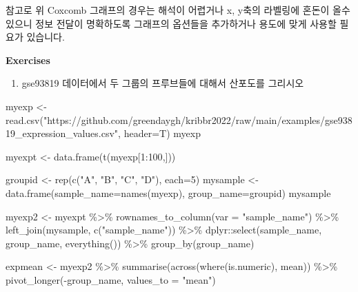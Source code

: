 \documentclass[
]{book}
\newenvironment{Shaded}{\begin{snugshade}}{\end{snugshade}}
\newcommand{\AttributeTok}[1]{\textcolor[rgb]{0.77,0.63,0.00}{#1}}
\newcommand{\DecValTok}[1]{\textcolor[rgb]{0.00,0.00,0.81}{#1}}
\newcommand{\FunctionTok}[1]{\textcolor[rgb]{0.00,0.00,0.00}{#1}}
\newcommand{\NormalTok}[1]{#1}
\newcommand{\OtherTok}[1]{\textcolor[rgb]{0.56,0.35,0.01}{#1}}
\newcommand{\SpecialCharTok}[1]{\textcolor[rgb]{0.00,0.00,0.00}{#1}}
\newcommand{\StringTok}[1]{\textcolor[rgb]{0.31,0.60,0.02}{#1}}
\providecommand{\tightlist}{%
  \setlength{\itemsep}{0pt}\setlength{\parskip}{0pt}}
\begin{document}
참고로 위 Coxcomb 그래프의 경우는 해석이 어렵거나 x, y축의 라벨링에 혼돈이 올수 있으니 정보 전달이 명확하도록 그래프의 옵션들을 추가하거나 용도에 맞게 사용할 필요가 있습니다.

\textbf{Exercises}

\begin{enumerate}
\def\labelenumi{\arabic{enumi}.}
\tightlist
\item
  gse93819 데이터에서 두 그룹의 프루브들에 대해서 산포도를 그리시오
\end{enumerate}

\begin{Shaded}
\begin{Highlighting}[]
\NormalTok{myexp }\OtherTok{\textless{}{-}} \FunctionTok{read.csv}\NormalTok{(}\StringTok{"https://github.com/greendaygh/kribbr2022/raw/main/examples/gse93819\_expression\_values.csv"}\NormalTok{, }\AttributeTok{header=}\NormalTok{T)}
\NormalTok{myexp}

\NormalTok{myexpt }\OtherTok{\textless{}{-}} \FunctionTok{data.frame}\NormalTok{(}\FunctionTok{t}\NormalTok{(myexp[}\DecValTok{1}\SpecialCharTok{:}\DecValTok{100}\NormalTok{,]))}

\NormalTok{groupid }\OtherTok{\textless{}{-}} \FunctionTok{rep}\NormalTok{(}\FunctionTok{c}\NormalTok{(}\StringTok{"A"}\NormalTok{, }\StringTok{"B"}\NormalTok{, }\StringTok{"C"}\NormalTok{, }\StringTok{"D"}\NormalTok{), }\AttributeTok{each=}\DecValTok{5}\NormalTok{)}
\NormalTok{mysample }\OtherTok{\textless{}{-}} \FunctionTok{data.frame}\NormalTok{(}\AttributeTok{sample\_name=}\FunctionTok{names}\NormalTok{(myexp), }\AttributeTok{group\_name=}\NormalTok{groupid)}
\NormalTok{mysample}

\NormalTok{myexp2 }\OtherTok{\textless{}{-}}\NormalTok{ myexpt }\SpecialCharTok{\%\textgreater{}\%} 
  \FunctionTok{rownames\_to\_column}\NormalTok{(}\AttributeTok{var =} \StringTok{"sample\_name"}\NormalTok{) }\SpecialCharTok{\%\textgreater{}\%} 
  \FunctionTok{left\_join}\NormalTok{(mysample, }\FunctionTok{c}\NormalTok{(}\StringTok{"sample\_name"}\NormalTok{)) }\SpecialCharTok{\%\textgreater{}\%} 
\NormalTok{  dplyr}\SpecialCharTok{::}\FunctionTok{select}\NormalTok{(sample\_name, group\_name, }\FunctionTok{everything}\NormalTok{()) }\SpecialCharTok{\%\textgreater{}\%} 
  \FunctionTok{group\_by}\NormalTok{(group\_name) }


\NormalTok{expmean }\OtherTok{\textless{}{-}}\NormalTok{ myexp2 }\SpecialCharTok{\%\textgreater{}\%} 
  \FunctionTok{summarise}\NormalTok{(}\FunctionTok{across}\NormalTok{(}\FunctionTok{where}\NormalTok{(is.numeric), mean)) }\SpecialCharTok{\%\textgreater{}\%} 
  \FunctionTok{pivot\_longer}\NormalTok{(}\SpecialCharTok{{-}}\NormalTok{group\_name, }\AttributeTok{values\_to =} \StringTok{"mean"}\NormalTok{)}


\end{Highlighting}
\end{Shaded}
\end{document}
